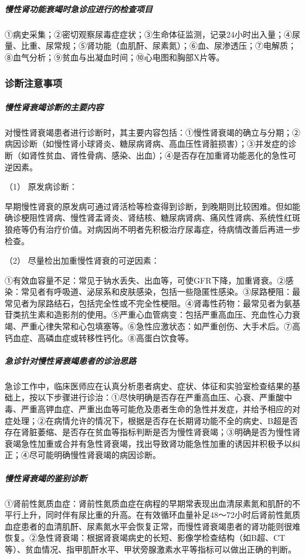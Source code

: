 \subparagraph{慢性肾功能衰竭时急诊应进行的检查项目}

①病史采集；②密切观察尿毒症症状；③生命体征监测，记录24小时出入量；④尿量、比重、尿常规；⑤肾功能（血肌酐、尿素氮）；⑥血、尿渗透压；⑦电解质；⑧血气分析；⑨贫血与出凝血时间；⑩心电图和胸部X片等。

\subsubsection{诊断注意事项}

\subparagraph{慢性肾衰竭诊断的主要内容}

对慢性肾衰竭患者进行诊断时，其主要内容包括：①慢性肾衰竭的确立与分期；②病因诊断（如慢性肾小球肾炎、糖尿病肾病、高血压性肾脏损害）；③并发症的诊断（如肾性贫血、肾性骨病、感染、出血）；④是否存在加重肾功能恶化的急性可逆因素。

\hypertarget{text00085.htmlux5cux23CHP3-8-6-3-1-1}{}
（1） 原发病诊断：

早期慢性肾衰的原发病可通过肾活检等检查得到诊断，到晚期则比较困难。但如能确诊梗阻性肾病、慢性肾盂肾炎、肾结核、糖尿病肾病、痛风性肾病、系统性红斑狼疮等仍有治疗价值。对病因尚不明者先积极治疗尿毒症，待病情改善后再进一步检查。

\hypertarget{text00085.htmlux5cux23CHP3-8-6-3-1-2}{}
（2） 尽量检出加重慢性肾衰的可逆因素：

①有效血容量不足：常见于钠水丢失、出血等，可使GFR下降，加重肾衰。②感染：常见者有呼吸道、泌尿系和皮肤感染，包括一些隐匿性感染。③尿路梗阻：最常见者为尿路结石，包括完全性或不完全性梗阻。④肾毒性药物：最常见者为氨基苷类抗生素和造影剂的使用。⑤严重心血管病变：包括严重高血压、充血性心力衰竭、严重心律失常和心包填塞等。⑥急性应激状态：如严重创伤、大手术后。⑦高钙血症、高磷血症或转移性钙化。⑧高蛋白饮食等。

\subparagraph{急诊针对慢性肾衰竭患者的诊治思路}

急诊工作中，临床医师应在认真分析患者病史、症状、体征和实验室检查结果的基础上，按以下步骤进行诊治：①尽快明确是否存在严重高血压、心衰、严重酸中毒、严重高钾血症、严重出血等可能危及患者生命的急性并发症，并给予相应的对症处理；②在病情允许的情况下，根据是否存在长期肾功能不全的病史、B超是否存在肾脏萎缩、是否存在贫血等指标判断是否为慢性肾衰竭；③明确是否为慢性肾衰竭急性加重或合并有急性肾衰竭，找出导致肾功能急性加重的诱因并积极予以纠正；④尽可能明确慢性肾衰竭的病因诊断。

\subparagraph{慢性肾衰竭的鉴别诊断}

①肾前性氮质血症：肾前性氮质血症在病程的早期常表现出血清尿素氮和肌酐的不平行上升，同时伴有尿比重的升高。在有效循环血量补足48～72小时后肾前性氮质血症患者的血清肌酐、尿素氮水平会恢复正常，而慢性肾衰竭患者的肾功能则很难恢复。②急性肾衰竭：根据肾衰竭病史的长短、影像学检查结构（如B超、CT等）、贫血情况、指甲肌酐水平、甲状旁腺激素水平等指标可以做出正确的判断。

